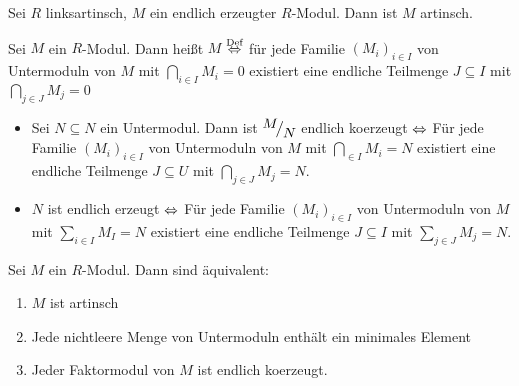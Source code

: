 \begin{fo}\label{fo3.19}
	Sei $R$ linksartinsch, $M$ ein endlich erzeugter $R$-Modul. Dann ist $M$ artinsch.
\end{fo}
\begin{df}\label{df3.20}
	Sei $M$ ein $R$-Modul. Dann heißt $M$  $\overset{\text{Def}}{\Leftrightarrow} $ für jede Familie $(M_i)_{i\in I}$ von Untermoduln von $M$ mit $\bigcap_{i\in I} M_i = 0$ existiert eine endliche Teilmenge $J\subseteq I$ mit $\bigcap_{j\in J} M_j = 0$
\end{df}
\begin{anm}
	\begin{itemize}
		\item Sei $N\subseteq N$ ein Untermodul. Dann ist $\QR{M}{N}$ endlich koerzeugt $\Leftrightarrow $ Für jede Familie $(M_i)_{i\in I}$ von Untermoduln von $M$ mit $\bigcap_{\in I} M_i = N$ existiert eine endliche Teilmenge $J \subseteq U$ mit $\bigcap_{j\in J} M_j = N$.
		\item $N$ ist endlich erzeugt $\Leftrightarrow$ Für jede Familie $(M_i)_{i\in I}$ von Untermoduln von $M$ mit $\sum_{i\in I} M_I = N$ existiert eine endliche Teilmenge $J\subseteq I$ mit $\sum_{j\in J} M_j = N$.
	\end{itemize}
\end{anm}
\begin{sa}\label{sa3.21}
	Sei $M$ ein $R$-Modul. Dann sind äquivalent:
	\begin{enumerate}[label= \alph*)]
		\item $M$ ist artinsch
		\item Jede nichtleere Menge von Untermoduln enthält ein minimales Element
		\item Jeder Faktormodul von $M$ ist endlich koerzeugt.
	\end{enumerate}
\end{sa}
